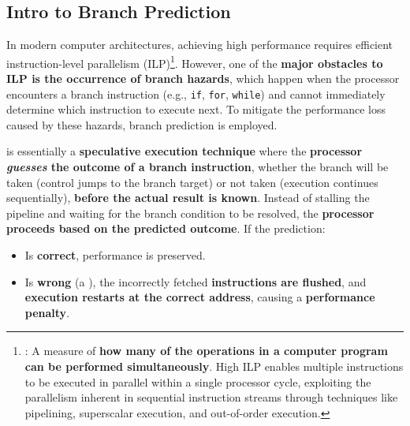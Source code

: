 \subsection{Intro to Branch Prediction}

In modern computer architectures, achieving high performance requires efficient instruction-level parallelism (ILP)\footnote{%
    : A measure of \textbf{how many of the operations in a computer program can be performed simultaneously}. High ILP enables multiple instructions to be executed in parallel within a single processor cycle, exploiting the parallelism inherent in sequential instruction streams through techniques like pipelining, superscalar execution, and out-of-order execution.
}. However, one of the \textbf{major obstacles to ILP is the occurrence of branch hazards}, which happen when the processor encounters a branch instruction (e.g., \texttt{if}, \texttt{for}, \texttt{while}) and cannot immediately determine which instruction to execute next. To mitigate the performance loss caused by these hazards, branch prediction is employed.

\highspace
{} is essentially a \textbf{speculative execution technique} where the \textbf{processor \emph{guesses} the outcome of a branch instruction}, whether the branch will be taken (control jumps to the branch target) or not taken (execution continues sequentially), \textbf{before the actual result is known}. Instead of stalling the pipeline and waiting for the branch condition to be resolved, the \textbf{processor proceeds based on the predicted outcome}. If the prediction:
\begin{itemize}
    \item[\textcolor{Green3}{\faIcon{check}}] Is \textcolor{Green3}{\textbf{correct}}, performance is preserved.
    \item[\textcolor{Red2}{\faIcon{times}}] Is \textcolor{Red2}{\textbf{wrong}} (a ), the incorrectly fetched \textbf{instructions are flushed}, and \textbf{execution restarts at the correct address}, causing a \textbf{performance penalty}.
\end{itemize}

